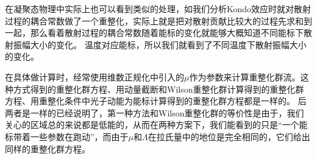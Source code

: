 在凝聚态物理中实际上也可以看到类似的处理，如我们分析Kondo效应时就对散射过程的耦合常数做了一个重整化，实际上就是把对散射贡献比较大的过程先求和到一起，那么看着散射过程的耦合常数随着能标的变化就能够大概知道不同能标下散射振幅大小的变化。
温度对应能标，所以我们就看到了不同温度下散射振幅大小的变化。

在具体做计算时，经常使用维数正规化中引入的$\mu$作为参数来计算重整化群流。这种方式得到的重整化群方程、用动量截断和Wilson重整化群计算得到的重整化群方程、用重整化条件中光子动能为能标计算得到的重整化群方程都是一样的。
后两者是一样的已经说明了，第一种方法和Wilson重整化群的等价性是由于，我们关心的区域总的来说都是低能的，从而在两种方案下，我们能看到的只是“一个能标带着一些参数在跑动”，而由于$\mu$和$\Lambda$在拉氏量中的地位是完全相同的，它们给出同样的重整化群方程。

